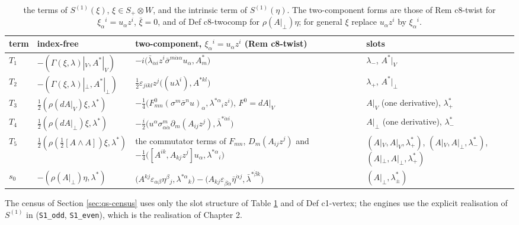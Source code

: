 \documentclass[11pt]{article}
\numberwithin{equation}{section}
\theoremstyle{plain}
\theoremstyle{definition}
\newcommand{\Ap}{A|_{\perp}}
\newcommand{\AV}{A|_V}
\begin{document}
\begin{longtable}{l|p{3.6cm}|p{7.2cm}|p{3.2cm}}
\caption{the terms of $S^{(1)}(\xi)$, $\xi\in S_+\otimes W$, and the intrinsic term of $S^{(1)}(\eta)$. The two-component forms are those of Rem c8-twist for $\xi_\alpha{}^i=u_\alpha z^i$, $\bar\xi=0$, and of Def c8-twocomp for $\rho(A|_\perp)\eta$; for general $\xi$ replace $u_\alpha z^i$ by $\xi_\alpha{}^i$.}\label{tab:qs-terms}\\
term & index-free & two-component, $\xi_\alpha{}^i=u_\alpha z^i$ (Rem c8-twist) & slots\\
\hline
$T_1$ & $-(\Gamma(\xi,\lambda)|_V,A^*|_V)$ & $-i\big(\bar\lambda_{\dot\alpha i}z^i\bar\sigma^{m\dot\alpha\alpha}u_\alpha,A^*_m\big)$ & $\lambda_-$, $A^*|_V$\\
$T_2$ & $-(\Gamma(\xi,\lambda)|_\perp,A^*|_\perp)$ & $\tfrac12\varepsilon_{jikl}z^j\big((u\lambda^i),A^{*kl}\big)$ & $\lambda_+$, $A^*|_\perp$\\
$T_3$ & $\tfrac12(\rho(dA|_V)\xi,\lambda^*)$ & $-\tfrac14\big(F^0_{mn}(\sigma^m\bar\sigma^nu)_\alpha,\lambda^{*\alpha}{}_iz^i\big)$, $F^0=dA|_V$ & $\AV$ (one derivative), $\lambda^*_+$\\
$T_4$ & $\tfrac12(\rho(dA|_\perp)\xi,\lambda^*)$ & $-\tfrac i2\big(u^\alpha\sigma^m_{\alpha\dot\alpha}\partial_m(A_{ij}z^j),\bar\lambda^{*\dot\alpha i}\big)$ & $\Ap$ (one derivative), $\lambda^*_-$\\
$T_{5}$ & $\tfrac12(\rho(\tfrac12[A\wedge A])\xi,\lambda^*)$ & the commutator terms of $F_{mn}$, $D_m(A_{ij}z^j)$ and $-\tfrac14\big([A^{ik},A_{kj}z^j]u_\alpha,\lambda^{*\alpha}{}_i\big)$ & $(\AV,\AV,\lambda^*_+)$, $(\AV,\Ap,\lambda^*_-)$, $(\Ap,\Ap,\lambda^*_+)$\\
$s_0$ & $-(\rho(A|_\perp)\eta,\lambda^*)$ & $\big(A^{kj}\varepsilon_{\alpha\beta}\eta^\beta{}_j,\lambda^{*\alpha}{}_k\big)-\big(A_{kj}\varepsilon_{\dot\beta\dot\alpha}\bar\eta^{\dot\alpha j},\bar\lambda^{*\dot\beta k}\big)$ & $(\Ap,\lambda^*_\pm)$\\
\end{longtable}


The census of Section \ref{sec:qs-census} uses only the slot structure of Table \ref{tab:qs-terms} and of Def c1-vertex; the engines use the explicit realisation of $S^{(1)}$ in  (\texttt{S1\_odd}, \texttt{S1\_even}), which is the realisation of Chapter 2.
\end{document}
